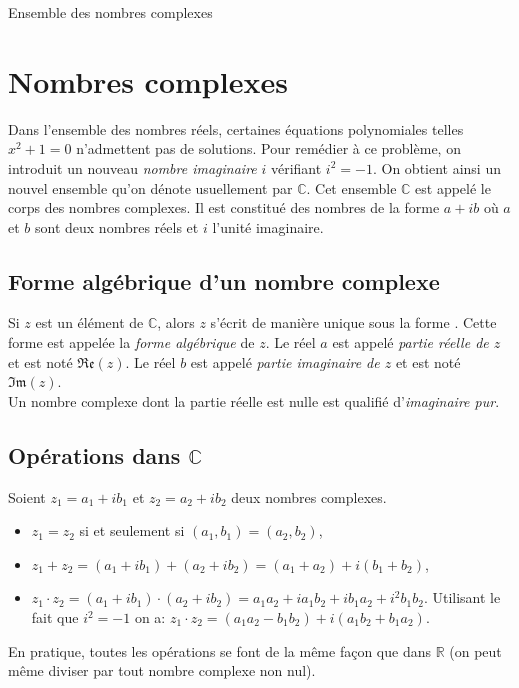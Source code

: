 
\TCDLessonStyleOn
\newcommand{\Reel}[1]{\mathfrak{Re}(#1)}
\newcommand{\Imag}[1]{\mathfrak{Im}(#1)}

\begin{chapter}{Ensemble des nombres complexes}
\section{Nombres complexes}
Dans l'ensemble des nombres r\'eels, certaines \'equations polynomiales telles $x^2 + 1 = 0$ n'admettent pas de solutions. 
Pour rem\'edier \`a ce probl\`eme, on introduit un nouveau \emph{nombre imaginaire} $i$ v\'erifiant $i^2 = -1$.
On obtient ainsi un nouvel ensemble qu'on d\'enote usuellement par $\mathbb{C}$. 
Cet ensemble $\mathbb{C}$ est appel\'e le corps des nombres complexes. 
Il est constitu\'e des nombres de la forme $a + i b$ o\`u $a$ et $b$ sont deux nombres r\'eels et $i$ l'unit\'e imaginaire.
%
\subsection{Forme alg\'ebrique d'un nombre complexe}
%
%
Si $z$ est un \'el\'ement de $\mathbb{C}$, alors $z$ s'\'ecrit de mani\`ere unique sous la forme .
Cette forme est appel\'ee la \emph{forme alg\'ebrique} de $z$.
Le r\'eel $a$ est appel\'e \emph{partie r\'eelle de $z$} et est not\'e $\Reel{z}$.
Le r\'eel $b$ est appel\'e \emph{partie imaginaire de $z$} et est not\'e $\Imag{z}$. \\
Un nombre complexe dont la partie r\'eelle est nulle est qualifi\'e d'\emph{imaginaire pur}.

\subsection{Op\'erations dans $\mathbb{C}$}
%
%
Soient $z_1 = a_1 + i b_1$ et $z_2 = a_2 + i b_2$ deux nombres complexes.
\begin{itemize}
\item $z_1 = z_2 $ si et seulement si $(a_1, b_1) = (a_2, b_2)$,
\item $z_1 + z_2 = (a_1 + i b_1) + (a_2 + i b_2) = (a_1 + a_2 ) + i (b_1 + b_2) $,
\item $z_1 \cdot z_2 = (a_1 + i b_1) \cdot (a_2 + i b_2) = a_1 a_2 + i a_1 b_2 + i b_1 a_2 + i^2 b_1 b_2$.
      Utilisant le fait que $i^2 = -1$ on a:
      $z_1 \cdot z_2 = (a_1 a_2 - b_1 b_2) + i (a_1 b_2 + b_1 a_2)$.
\end{itemize}
En pratique, toutes les op\'erations se font de la m\^eme fa\c{c}on que dans $\mathbb{R}$ (on peut m\^eme diviser par tout nombre complexe non nul).


\end{chapter}
